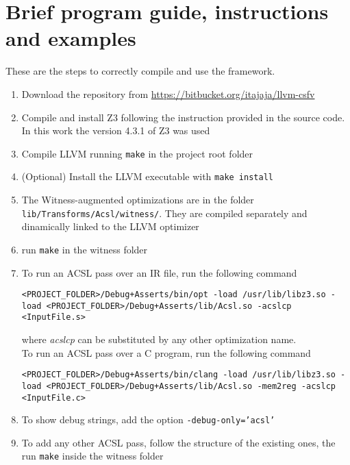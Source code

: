 \chapter{Brief program guide, instructions and examples}

These are the steps to correctly compile and use the framework.

\begin{enumerate}
  \item Download the repository from \url{https://bitbucket.org/itajaja/llvm-csfv}
  \item Compile and install Z3 following the instruction provided in the source code. In this work the version 4.3.1 of Z3 was used
  \item Compile LLVM running \texttt{make} in the project root folder
  \item (Optional) Install the LLVM executable with \texttt{make install}
  \item The Witness-augmented optimizations are in the folder \texttt{lib/Transforms/Acsl/witness/}. They are compiled separately and dinamically linked to the LLVM optimizer
  \item run \texttt{make} in the witness folder
  \item To run an ACSL pass over an IR file, run the following command
  \begin{center}
\texttt{\footnotesize <PROJECT\_FOLDER>/Debug+Asserts/bin/opt -load /usr/lib/libz3.so -load <PROJECT\_FOLDER>/Debug+Asserts/lib/Acsl.so -acslcp  <InputFile.s>}  \end{center}
where \emph{acslcp} can be substituted by any other optimization name.\\
To run an ACSL pass over a C program, run the following command
  \begin{center}
\texttt{\footnotesize <PROJECT\_FOLDER>/Debug+Asserts/bin/clang -load /usr/lib/libz3.so -load <PROJECT\_FOLDER>/Debug+Asserts/lib/Acsl.so -mem2reg -acslcp  <InputFile.c>}  \end{center}
\item To show debug strings, add the option \texttt{-debug-only='acsl'}
\item To add any other ACSL pass, follow the structure of the existing ones, the run \texttt{make} inside the witness folder
\end{enumerate}
